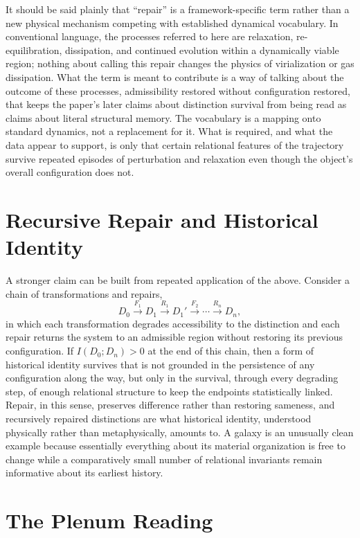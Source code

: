 \documentclass[11pt]{article}
\begin{document}
It should be said plainly that ``repair'' is a framework-specific term rather than a new physical mechanism competing with established dynamical vocabulary. In conventional language, the processes referred to here are relaxation, re-equilibration, dissipation, and continued evolution within a dynamically viable region; nothing about calling this repair changes the physics of virialization or gas dissipation. What the term is meant to contribute is a way of talking about the outcome of these processes, admissibility restored without configuration restored, that keeps the paper's later claims about distinction survival from being read as claims about literal structural memory. The vocabulary is a mapping onto standard dynamics, not a replacement for it. What is required, and what the data appear to support, is only that certain relational features of the trajectory survive repeated episodes of perturbation and relaxation even though the object's overall configuration does not.

\section{Recursive Repair and Historical Identity}

A stronger claim can be built from repeated application of the above. Consider a chain of transformations and repairs,
\begin{equation}
D_0 \xrightarrow{F_1} D_1 \xrightarrow{R_1} D_1' \xrightarrow{F_2} \cdots \xrightarrow{R_n} D_n,
\end{equation}
in which each transformation degrades accessibility to the distinction and each repair returns the system to an admissible region without restoring its previous configuration. If $I(D_0; D_n) > 0$ at the end of this chain, then a form of historical identity survives that is not grounded in the persistence of any configuration along the way, but only in the survival, through every degrading step, of enough relational structure to keep the endpoints statistically linked. Repair, in this sense, preserves difference rather than restoring sameness, and recursively repaired distinctions are what historical identity, understood physically rather than metaphysically, amounts to. A galaxy is an unusually clean example because essentially everything about its material organization is free to change while a comparatively small number of relational invariants remain informative about its earliest history.

\section{The Plenum Reading}
\end{document}
